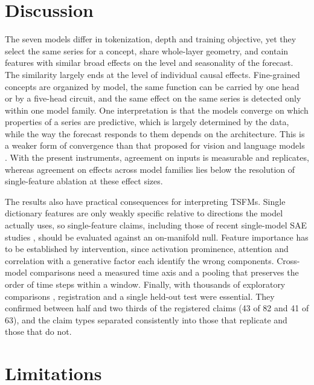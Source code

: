 \section{Discussion}
\label{sec:discussion}

The seven models differ in tokenization, depth and training objective, yet they select the same series for a concept,
share whole-layer geometry, and contain features with similar broad effects on the level and seasonality of the forecast.
The similarity largely ends at the level of individual causal effects. Fine-grained concepts are organized by model, the
same function can be carried by one head or by a five-head circuit, and the same effect on the same series is detected
only within one model family. One interpretation is that the models converge on which properties of a series are
predictive, which is largely determined by the data, while the way the forecast responds to them depends on the
architecture. This is a weaker form of convergence than that proposed for vision and language models
\citep{li2016convergent,huh2024platonic}. With the present instruments, agreement on inputs is measurable and replicates,
whereas agreement on effects across model families lies below the resolution of single-feature ablation at these
effect sizes.

The results also have practical consequences for interpreting TSFMs. Single dictionary features are only weakly
specific relative to directions the model actually uses, so single-feature claims, including those of recent
single-model SAE studies \citep{mishra2026dissecting,oublal2026timesae,divo2026zeitgeist}, should be evaluated against
an on-manifold null. Feature importance has to be established by intervention, since activation prominence, attention
and correlation with a generative factor each identify the wrong components. Cross-model comparisons need a measured
time axis and a pooling that preserves the order of time steps within a window. Finally, with thousands of exploratory
comparisons \citep{gelman2014garden}, registration and a single held-out test were essential. They confirmed between
half and two thirds of the registered claims (43 of 82 and 41 of 63), and the claim types separated consistently into
those that replicate and those that do not.

\section{Limitations}
\label{sec:limitations}

